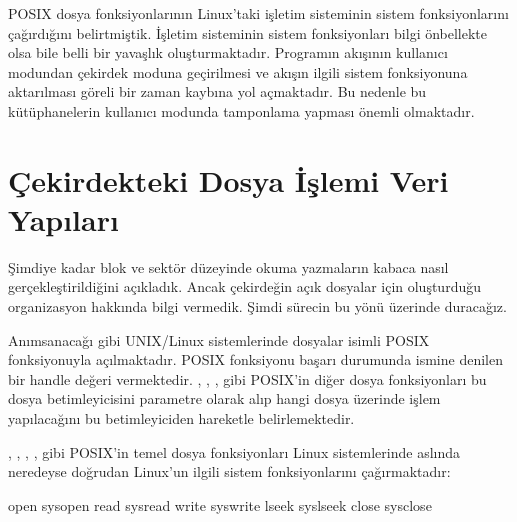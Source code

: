 \documentclass[a4paper,10pt,turkish]{sphinxmanual}
\begin{document}
\sphinxAtStartPar
POSIX dosya fonksiyonlarının Linux’taki işletim sisteminin sistem fonksiyonlarını çağırdığını
belirtmiştik. İşletim sisteminin sistem fonksiyonları bilgi önbellekte olsa bile belli bir
yavaşlık oluşturmaktadır. Programın akışının kullanıcı modundan çekirdek moduna geçirilmesi ve
akışın ilgili sistem fonksiyonuna aktarılması göreli bir zaman kaybına yol açmaktadır. Bu nedenle
bu kütüphanelerin kullanıcı modunda tamponlama yapması önemli olmaktadır.


\section{Çekirdekteki Dosya İşlemi Veri Yapıları}
\label{\detokenize{filesystem1:cekirdekteki-dosya-islemi-veri-yapilari}}
\sphinxAtStartPar
Şimdiye kadar blok ve sektör düzeyinde okuma yazmaların kabaca nasıl gerçekleştirildiğini
açıkladık. Ancak çekirdeğin açık dosyalar için oluşturduğu organizasyon hakkında bilgi vermedik.
Şimdi sürecin bu yönü üzerinde duracağız.

\sphinxAtStartPar
Anımsanacağı gibi UNIX/Linux sistemlerinde dosyalar  isimli POSIX fonksiyonuyla
açılmaktadır.  POSIX fonksiyonu başarı durumunda ismine  denilen bir handle değeri vermektedir. , , , 
gibi POSIX’in diğer dosya fonksiyonları bu dosya betimleyicisini parametre olarak alıp hangi
dosya üzerinde işlem yapılacağını bu betimleyiciden hareketle belirlemektedir.

\sphinxAtStartPar
{}, , , ,  gibi POSIX’in temel dosya fonksiyonları
Linux sistemlerinde aslında neredeyse doğrudan Linux’un ilgili sistem fonksiyonlarını
çağırmaktadır:

\begin{sphinxVerbatim}[commandchars=\\\{\}]
open  \PYGZhy{}\PYGZhy{}\PYGZhy{}\PYGZgt{} sys\PYGZus{}open
read  \PYGZhy{}\PYGZhy{}\PYGZhy{}\PYGZgt{} sys\PYGZus{}read
write \PYGZhy{}\PYGZhy{}\PYGZhy{}\PYGZgt{} sys\PYGZus{}write
lseek \PYGZhy{}\PYGZhy{}\PYGZhy{}\PYGZgt{} sys\PYGZus{}lseek
close \PYGZhy{}\PYGZhy{}\PYGZhy{}\PYGZgt{} sys\PYGZus{}close
\end{sphinxVerbatim}
\end{document}
